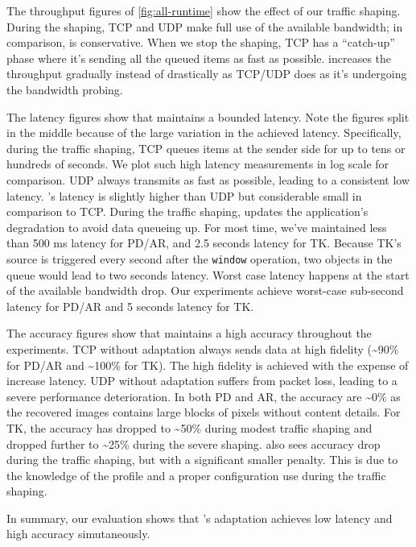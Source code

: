 The throughput figures of \autoref{fig:all-runtime} show the effect of our
traffic shaping. During the shaping, TCP and UDP make full use of the available
bandwidth; in comparison, \sysname{} is conservative. When we stop the shaping,
TCP has a ``catch-up'' phase where it's sending all the queued items as fast as
possible. \sysname{} increases the throughput gradually instead of drastically
as TCP/UDP does as it's undergoing the bandwidth probing.

The latency figures show that \sysname{} maintains a bounded latency. Note the
figures split in the middle because of the large variation in the achieved
latency. Specifically, during the traffic shaping, TCP queues items at the
sender side for up to tens or hundreds of seconds. We plot such high latency
measurements in log scale for comparison. UDP always transmits as fast as
possible, leading to a consistent low latency. \sysname{}'s latency is slightly
higher than UDP but considerable small in comparison to TCP. During the traffic
shaping, \sysname{} updates the application's degradation to avoid data queueing
up. For most time, we've maintained less than 500 ms latency for PD/AR, and 2.5
seconds latency for TK. Because TK's source is triggered every second after the
\texttt{window} operation, two objects in the queue would lead to two seconds
latency. Worst case latency happens at the start of the available bandwidth
drop. Our experiments achieve worst-case sub-second latency for PD/AR and 5
seconds latency for TK.

The accuracy figures show that \sysname{} maintains a high accuracy throughout
the experiments. TCP without adaptation always sends data at high fidelity
(\textasciitilde 90\% for PD/AR and \textasciitilde 100\% for TK). The high
fidelity is achieved with the expense of increase latency. UDP without
adaptation suffers from packet loss, leading to a severe performance
deterioration.  In both PD and AR, the accuracy are \textasciitilde 0\% as the
recovered images contains large blocks of pixels without content details. For
TK, the accuracy has dropped to \textasciitilde 50\% during modest traffic
shaping and dropped further to \textasciitilde 25\% during the severe
shaping. \sysname{} also sees accuracy drop during the traffic shaping, but with
a significant smaller penalty. This is due to the knowledge of the profile and a
proper configuration use during the traffic shaping.

In summary, our evaluation shows that \sysname{}'s adaptation achieves low
latency and high accuracy simutaneously.


